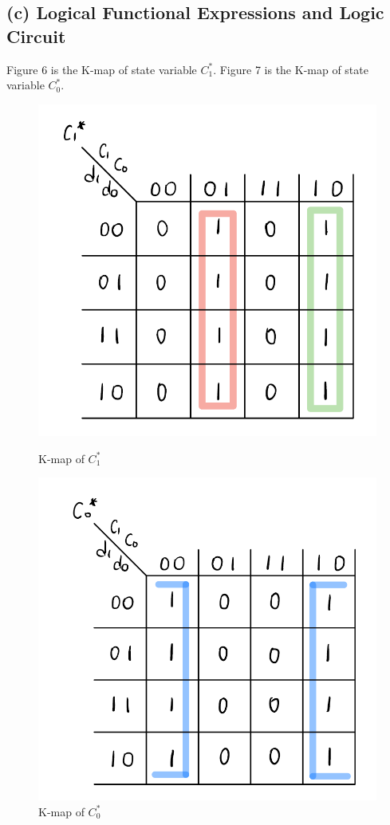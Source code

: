 \documentclass{article}
\begin{document}
\subsection*{(c) Logical Functional Expressions and Logic Circuit}
Figure 6 is the K-map of state variable $C_1^*$. Figure 7 is the K-map of state variable $C_0^*$.
\begin{figure}[!ht]
    \centering
    \begin{minipage}{0.45\textwidth}
        \centering
        \includegraphics[width=.8\linewidth]{src/Part 2_Kmap_C1.png}
        \caption{K-map of $C_1^*$}
    \end{minipage}\hfill
    \begin{minipage}{0.45\textwidth}
        \centering
        \includegraphics[width=.8\linewidth]{src/Part 2_Kmap_C0.png}
        \caption{K-map of $C_0^*$}
    \end{minipage}
\end{figure}
\end{document}
